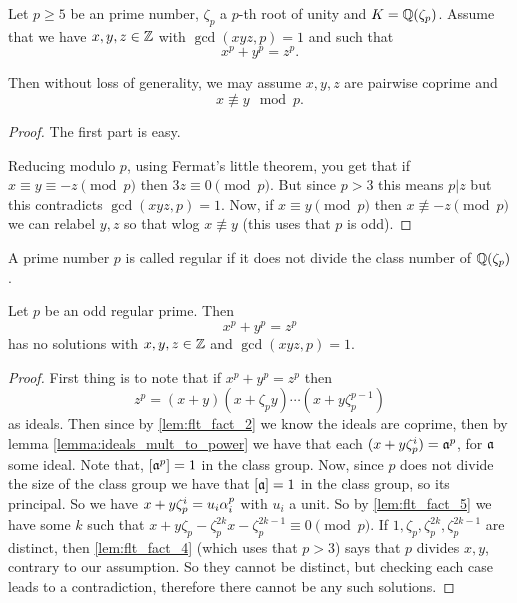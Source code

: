 \begin{lemma}\label{lemma:may_assume}

	Let $p \geq 5$ be an prime number, $\zeta_p$ a $p$-th root of unity and $K=\mathbb{Q}(\zeta_p)$.  Assume that we have $x,y,z \in \mathbb{Z}$ with $\gcd(xyz,p)=1$ and such that \[x^p+y^p=z^p.\]

Then without loss of generality, we may assume $x,y,z$ are pairwise coprime and \[x \not \equiv y \mod p.\]
\end{lemma}



\begin{proof}
The first part is easy.

Reducing modulo $p$, using Fermat's little theorem, you get that if $x \equiv y \equiv -z \pmod p$ then $3z \equiv 0 \pmod p$. But since $p >3$ this means $p |z$ but this contradicts $\gcd(xyz,p)=1$. Now, if $x \equiv y \pmod p$ then  $x \not \equiv -z \pmod p$ we can relabel $y,z$ so that wlog $x \not \equiv y$ (this uses that $p$ is odd).

\end{proof}

\begin{definition}\label{defn:is_regular_number}
	\leanok
	A prime number $p$ is called regular if it does not divide the class number of $\mathbb{Q}(\zeta_p)$.
\end{definition}


\begin{theorem}\label{theorem:FLT_case_one}
	Let $p$ be an odd regular prime. Then \[x^p+y^p=z^p\] has no solutions with $x,y,z \in \mathbb{Z}$ and $\gcd(xyz,p)=1$.
\end{theorem}
\begin{proof}
	First thing is to note that if $x^p+y^p=z^p$ then \[z^p=(x+y)(x+\zeta_py)\cdots(x+y\zeta_p^{p-1})\] as ideals. Then since by \ref{lem:flt_fact_2} we know the ideals are coprime, then by lemma \ref{lemma:ideals_mult_to_power} we have that each $(x+y\zeta_p^i)=\mathfrak{a}^p$, for $\mathfrak{a}$ some ideal. Note that, $[\mathfrak{a}^p]=1$ in the class group. Now, since $p$ does not divide the size of the class group we have that $[\mathfrak{a}]=1$ in the class group, so its principal. So we have $x+y\zeta_p^i=u_i\alpha_i^p$ with $u_i$ a unit. So by \ref{lem:flt_fact_5} we have some $k$ such that $x+y\zeta_p-\zeta_p^{2k}x-\zeta_p^{2k-1} \equiv 0 \pmod p$. If $1,\zeta_p,\zeta_p^{2k},\zeta_p^{2k-1}$ are distinct, then \ref{lem:flt_fact_4} (which uses that $p>3$) says that $p$  divides $x,y$, contrary to our assumption. So they cannot be distinct, but checking each case leads to a contradiction, therefore there cannot be any such solutions.
\end{proof}

